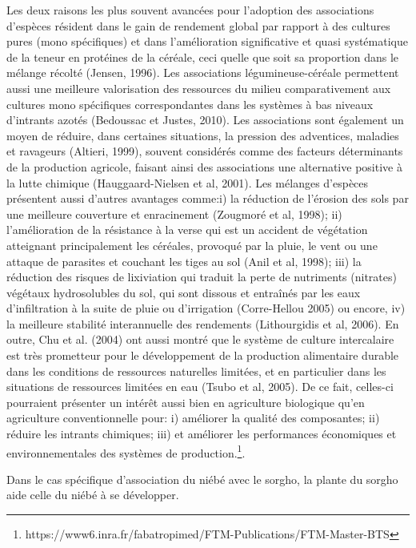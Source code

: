 \documentclass[a4paper,11pt]{article}
\begin{document}
Les deux raisons les plus souvent avancées pour l’adoption des
associations d’espèces résident dans le gain de rendement global par
rapport à des cultures pures (mono spécifiques) et dans l’amélioration
significative et quasi systématique de la teneur en protéines de la
céréale, ceci quelle que soit sa proportion dans le mélange récolté
(Jensen, 1996). Les associations légumineuse-céréale permettent aussi
une meilleure valorisation des ressources du milieu comparativement
aux cultures mono spécifiques correspondantes dans les systèmes à bas
niveaux d’intrants azotés (Bedoussac et Justes, 2010). Les
associations sont également un moyen de réduire, dans certaines
situations, la pression des adventices, maladies et ravageurs
(Altieri, 1999), souvent considérés comme des facteurs déterminants de
la production agricole, faisant ainsi des associations une alternative
positive à la lutte chimique (Hauggaard-Nielsen et al, 2001). Les
mélanges d’espèces présentent aussi d’autres avantages comme:i) la
réduction de l’érosion des sols par une meilleure couverture et
enracinement (Zougmoré et al, 1998); ii) l’amélioration de la
résistance à la verse qui est un accident de végétation atteignant
principalement les céréales, provoqué par la pluie, le vent ou une
attaque de parasites et couchant les tiges au sol (Anil et al, 1998);
 iii) la réduction des risques de lixiviation qui traduit la perte de
nutriments (nitrates) végétaux hydrosolubles du sol, qui sont dissous
et entraînés par les eaux d’infiltration à la suite de pluie ou
d’irrigation (Corre-Hellou 2005) ou encore, iv) la meilleure stabilité
interannuelle des rendements (Lithourgidis et al, 2006). En outre, Chu
et al. (2004) ont aussi montré que le système de culture intercalaire
est très prometteur pour le développement de la production alimentaire
durable dans les conditions de ressources naturelles limitées, et en
particulier dans les situations de ressources limitées en eau (Tsubo
et al, 2005). De ce fait, celles-ci pourraient présenter un intérêt
aussi bien en agriculture biologique qu’en agriculture conventionnelle
pour: i) améliorer la qualité des composantes; ii) réduire les
intrants chimiques; iii) et améliorer les performances économiques et
environnementales des systèmes de production.\footnote{https://www6.inra.fr/fabatropimed/FTM-Publications/FTM-Master-BTS}.

Dans le cas spécifique d’association du niébé avec le sorgho, la
plante du sorgho aide celle du niébé à se développer.

\end{document}
